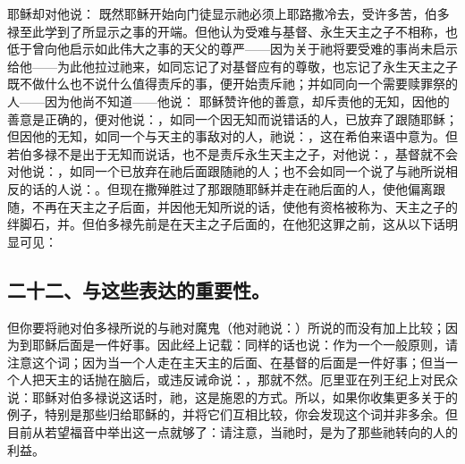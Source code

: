   耶稣却对他说：  既然耶稣开始向门徒显示祂必须上耶路撒冷去，受许多苦，伯多禄至此学到了所显示之事的开端。但他认为受难与基督、永生天主之子不相称，也低于曾向他启示如此伟大之事的天父的尊严——因为关于祂将要受难的事尚未启示给他——为此他拉过祂来，如同忘记了对基督应有的尊敬，也忘记了永生天主之子既不做什么也不说什么值得责斥的事，便开始责斥祂；并如同向一个需要赎罪祭的人——因为他尚不知道——他说： 耶稣赞许他的善意，却斥责他的无知，因他的善意是正确的，便对他说：，如同一个因无知而说错话的人，已放弃了跟随耶稣；但因他的无知，如同一个与天主的事敌对的人，祂说：，这在希伯来语中意为。但若伯多禄不是出于无知而说话，也不是责斥永生天主之子，对他说：，基督就不会对他说：，如同一个已放弃在祂后面跟随祂的人；也不会如同一个说了与祂所说相反的话的人说：。但现在撒殚胜过了那跟随耶稣并走在祂后面的人，使他偏离跟随，不再在天主之子后面，并因他无知所说的话，使他有资格被称为、天主之子的绊脚石，并。但伯多禄先前是在天主之子后面的，在他犯这罪之前，这从以下话明显可见：\par


\subsection{二十二、与这些表达的重要性。}

但你要将祂对伯多禄所说的与祂对魔鬼（他对祂说：）所说的而没有加上比较；因为到耶稣后面是一件好事。因此经上记载：同样的话也说：作为一个一般原则，请注意这个词；因为当一个人走在主天主的后面、在基督的后面是一件好事；但当一个人把天主的话抛在脑后，或违反诫命说：，那就不然。厄里亚在列王纪上对民众说：耶稣对伯多禄说这话时，祂，这是施恩的方式。所以，如果你收集更多关于的例子，特别是那些归给耶稣的，并将它们互相比较，你会发现这个词并非多余。但目前从若望福音中举出这一点就够了：请注意，当祂时，是为了那些祂转向的人的利益。\par

